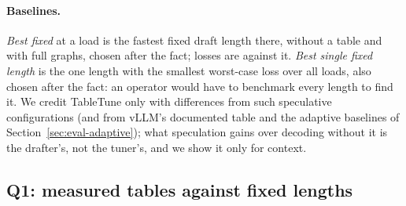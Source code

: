 \documentclass{article}
\newcommand{\sys}{TableTune}
\begin{document}
\paragraph{Baselines.} \emph{Best fixed} at a load is the fastest fixed draft length there, without a table and with full graphs, chosen after the fact; losses are against it. \emph{Best single fixed length} is the one length with the smallest worst-case loss over all loads, also chosen after the fact: an operator would have to benchmark every length to find it. We credit \sys{} only with differences from such speculative configurations (and from vLLM's documented table and the adaptive baselines of Section~\ref{sec:eval-adaptive}); what speculation gains over decoding without it is the drafter's, not the tuner's, and we show it only for context.

\subsection{Q1: measured tables against fixed lengths}
\label{sec:eval-tables}
\end{document}
